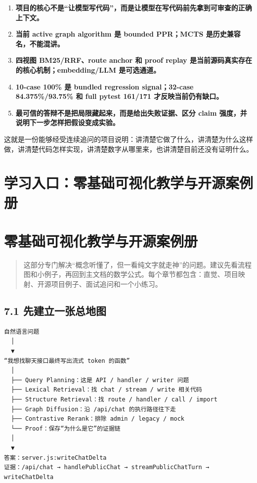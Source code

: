 \documentclass[UTF8,12pt,openany]{ctexbook}
\begin{document}
\begin{enumerate}
\item \textbf{项目的核心不是“让模型写代码”，而是让模型在写代码前先拿到可审查的正确上下文。}
\item \textbf{当前 active graph algorithm 是 bounded PPR；MCTS 是历史兼容名，不能混讲。}
\item \textbf{四视图 BM25/RRF、route anchor 和 proof replay 是当前源码真实存在的核心机制；embedding/LLM 是可选通道。}
\item \textbf{10-case 100\% 是 bundled regression signal；32-case 84.375\%/93.75\% 和 full pytest 161/171 才反映当前仍有缺口。}
\item \textbf{最可信的答辩不是把局限藏起来，而是给出失败证据、区分 claim 强度，并说明下一步怎样把假设变成实验。}
\end{enumerate}

这就是一份能够经受连续追问的项目说明：讲清楚它做了什么，讲清楚为什么这样做，讲清楚代码怎样实现，讲清楚数字从哪里来，也讲清楚目前还没有证明什么。\par


\clearpage
\chapter{学习入口：零基础可视化教学与开源案例册}

\clearpage
\chapter{零基础可视化教学与开源案例册}

\begin{quote}
这部分专门解决“概念听懂了，但一看纯文字就走神”的问题。建议先看流程图和小例子，再回到主文档的数学公式。每个章节都包含：直觉、项目映射、开源项目例子、面试追问和一个小练习。
\end{quote}

\section{7.1 先建立一张总地图}

\begin{lstlisting}
自然语言问题
  │
  ▼
“我想找聊天接口最终写出流式 token 的函数”
  │
  ├── Query Planning：这是 API / handler / writer 问题
  ├── Lexical Retrieval：找 chat / stream / write 相关代码
  ├── Structure Retrieval：找 route / handler / call / import
  ├── Graph Diffusion：沿 /api/chat 的执行路径往下走
  ├── Contrastive Rerank：排除 admin / legacy / mock
  └── Proof：保存“为什么是它”的证据链
  │
  ▼
答案：server.js:writeChatDelta
证据：/api/chat → handlePublicChat → streamPublicChatTurn → writeChatDelta
\end{lstlisting}
\end{document}
